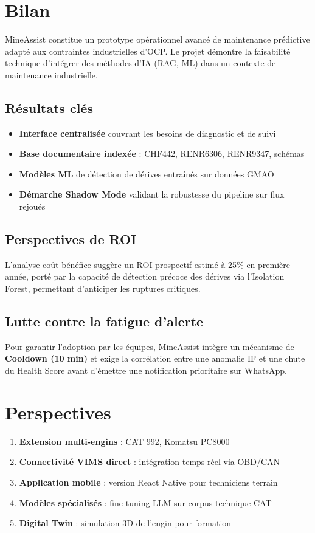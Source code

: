 \documentclass[12pt,a4paper]{report}
\begin{document}
\section{Bilan}

MineAssist constitue un prototype opérationnel avancé de maintenance prédictive adapté aux contraintes industrielles d'OCP. Le projet démontre la faisabilité technique d'intégrer des méthodes d'IA (RAG, ML) dans un contexte de maintenance industrielle.

\subsection*{Résultats clés}
\begin{itemize}
  \item \textbf{Interface centralisée} couvrant les besoins de diagnostic et de suivi
  \item \textbf{Base documentaire indexée} : CHF442, RENR6306, RENR9347, schémas
  \item \textbf{Modèles ML} de détection de dérives entraînés sur données GMAO
  \item \textbf{Démarche Shadow Mode} validant la robustesse du pipeline sur flux rejoués
\end{itemize}

\subsection*{Perspectives de ROI}
L'analyse coût-bénéfice suggère un ROI prospectif estimé à 25\% en première année, porté par la capacité de détection précoce des dérives via l'Isolation Forest, permettant d'anticiper les ruptures critiques.

\subsection*{Lutte contre la fatigue d'alerte}
Pour garantir l'adoption par les équipes, MineAssist intègre un mécanisme de \textbf{Cooldown (10 min)} et exige la corrélation entre une anomalie IF et une chute du Health Score avant d'émettre une notification prioritaire sur WhatsApp.

\section{Perspectives}

\begin{enumerate}
  \item \textbf{Extension multi-engins} : CAT 992, Komatsu PC8000
  \item \textbf{Connectivité VIMS direct} : intégration temps réel via OBD/CAN
  \item \textbf{Application mobile} : version React Native pour techniciens terrain
  \item \textbf{Modèles spécialisés} : fine-tuning LLM sur corpus technique CAT
  \item \textbf{Digital Twin} : simulation 3D de l'engin pour formation
\end{enumerate}
\end{document}
